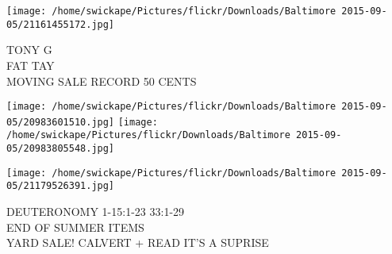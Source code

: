 \documentclass[10pt,letterpaper]{article}
\begin{document}
\vspace{0.25in}
\texttt{[image: /home/swickape/Pictures/flickr/Downloads/Baltimore 2015-09-05/21161455172.jpg]}

TONY G\\
FAT TAY\\
MOVING SALE RECORD 50 CENTS\\
\pagebreak

\texttt{[image: /home/swickape/Pictures/flickr/Downloads/Baltimore 2015-09-05/20983601510.jpg]}
\texttt{[image: /home/swickape/Pictures/flickr/Downloads/Baltimore 2015-09-05/20983805548.jpg]}

\texttt{[image: /home/swickape/Pictures/flickr/Downloads/Baltimore 2015-09-05/21179526391.jpg]}

DEUTERONOMY 1{-}15:1{-}23 33:1{-}29\\
END OF SUMMER ITEMS\\
YARD SALE! CALVERT + READ IT'S A SUPRISE\\
\pagebreak
\end{document}
